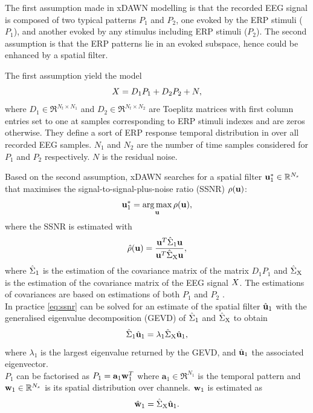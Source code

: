 The first assumption made in xDAWN modelling is that the recorded EEG signal is composed of two typical patterns $P_1$ and $P_2$, one evoked by the ERP stimuli ( $P_1$), and another evoked by any stimulus including ERP stimuli ($P_2$). The second assumption is that the ERP patterns lie in an evoked subspace, hence could be enhanced by a spatial filter.

The first assumption yield the model
\begin{equation}
X = D_1 P_1 + D_2 P_2 + N,
\end{equation} 
where $D_1 \in \Re^{N_t \times N_1}$ and $D_2 \in \Re^{N_t \times N_2}$ are Toeplitz matrices with first column entries set to one at samples corresponding to ERP stimuli indexes and are zeros otherwise. They define a sort of ERP response temporal distribution in over all recorded EEG samples. $N_1$ and $N_2$ are the number of time samples considered for $P_1$ and $P_2$ respectively. $N$ is the residual noise. 

Based on the second assumption, xDAWN searches for a spatial filter $\mathbf{u}_1^* \in \mathbb{R}^{N_s}$ that maximises the signal-to-signal-plus-noise ratio (SSNR) $\rho(\mathbf{u})$:
\begin{equation}
\label{eq:xdawn-problem}
\xfilt_1^{*} = \argmax_{\xfilt} \ssnr(\xfilt),
\end{equation}
where the SSNR is estimated with 
\begin{equation}
\label{eq:ssnr}
\hat{\ssnr}(\xfilt) = \frac{\xfilt^T \cov{1} \xfilt}{\xfilt^T \cov{\X} \xfilt}, 
\end{equation} 
where $\hat{\Sigma}_{\operatorname{1}}$ is the estimation of the covariance matrix of the matrix $D_1 P_1$ and  $\hat{\Sigma}_{\operatorname{X}}$ is the estimation of the covariance matrix of the EEG signal $X$.
The estimations of covariances are based on estimations of both $P_1$ and $P_2$ \citep[] [as described in ]{rivet_theoretical_2011}.
\\In practice \eqref{eq:ssnr} can be solved for an estimate of the spatial filter $\hat{\mathbf{u}}_1$ with the generalised eigenvalue decomposition (GEVD) of $\hat{\Sigma}_{\operatorname{1}}$ and $\hat{\Sigma}_{\operatorname{X}}$ to obtain
\begin{equation}
\label{eq:xdawn-gen-eigen}
\cov{1} \hat{\xfilt}_1 = \lambda_1 \cov{\X} \hat{\xfilt}_1,
\end{equation} 
where $\lambda_1$ is the largest eigenvalue returned by the GEVD, and $\hat{\mathbf{u}}_1$ the associated eigenvector. 
\\$P_1$ can be factorised as $P_1 = \mathbf{a}_1 \mathbf{\mathbf{w}}_1^T$ where $\mathbf{a}_1 \in \Re^{N_1}$ is the temporal pattern and $\mathbf{\mathbf{w}}_1 \in \mathbb{R}^{N_s}$ is its spatial distribution over channels. 
$\mathbf{\mathbf{w}}_1$ is estimated as
\begin{equation}
\hat{\mathbf{\mathbf{w}}}_1 = \hat{\Sigma}_{\operatorname{X}} \hat{\mathbf{u}}_1.
\end{equation}
 
